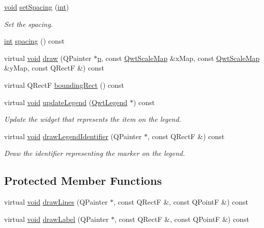 \begin{DoxyCompactItemize}
\item 
\hyperlink{group___u_a_v_objects_plugin_ga444cf2ff3f0ecbe028adce838d373f5c}{void} \hyperlink{class_qwt_plot_marker_a856c9c5c6e22d86461ee6df101534831}{set\-Spacing} (\hyperlink{ioapi_8h_a787fa3cf048117ba7123753c1e74fcd6}{int})
\begin{DoxyCompactList}\small\item\em Set the spacing. \end{DoxyCompactList}\item 
\hyperlink{ioapi_8h_a787fa3cf048117ba7123753c1e74fcd6}{int} \hyperlink{class_qwt_plot_marker_ad7655fdd7089b6c8058c238f1462f298}{spacing} () const 
\item 
virtual \hyperlink{group___u_a_v_objects_plugin_ga444cf2ff3f0ecbe028adce838d373f5c}{void} \hyperlink{class_qwt_plot_marker_abfd653364d9feeac09cd7ba77a650e3b}{draw} (Q\-Painter $\ast$\hyperlink{glext_8h_aa5367c14d90f462230c2611b81b41d23}{p}, const \hyperlink{class_qwt_scale_map}{Qwt\-Scale\-Map} \&x\-Map, const \hyperlink{class_qwt_scale_map}{Qwt\-Scale\-Map} \&y\-Map, const Q\-Rect\-F \&) const 
\item 
virtual Q\-Rect\-F \hyperlink{class_qwt_plot_marker_a270ada9e0a68dcfd5cf0f7629af898a2}{bounding\-Rect} () const 
\item 
virtual \hyperlink{group___u_a_v_objects_plugin_ga444cf2ff3f0ecbe028adce838d373f5c}{void} \hyperlink{class_qwt_plot_marker_a75ea063a742c23ab1952fc2bf96b5762}{update\-Legend} (\hyperlink{class_qwt_legend}{Qwt\-Legend} $\ast$) const 
\begin{DoxyCompactList}\small\item\em Update the widget that represents the item on the legend. \end{DoxyCompactList}\item 
virtual \hyperlink{group___u_a_v_objects_plugin_ga444cf2ff3f0ecbe028adce838d373f5c}{void} \hyperlink{class_qwt_plot_marker_ae99020d14c8ec4567ed94cdeb805fea1}{draw\-Legend\-Identifier} (Q\-Painter $\ast$, const Q\-Rect\-F \&) const 
\begin{DoxyCompactList}\small\item\em Draw the identifier representing the marker on the legend. \end{DoxyCompactList}\end{DoxyCompactItemize}
\subsection*{Protected Member Functions}
\begin{DoxyCompactItemize}
\item 
virtual \hyperlink{group___u_a_v_objects_plugin_ga444cf2ff3f0ecbe028adce838d373f5c}{void} \hyperlink{class_qwt_plot_marker_a4f0ebfc835da7397ee823860cfac62ca}{draw\-Lines} (Q\-Painter $\ast$, const Q\-Rect\-F \&, const Q\-Point\-F \&) const 
\item 
virtual \hyperlink{group___u_a_v_objects_plugin_ga444cf2ff3f0ecbe028adce838d373f5c}{void} \hyperlink{class_qwt_plot_marker_a528aa01fd96e43829afc817433da49d4}{draw\-Label} (Q\-Painter $\ast$, const Q\-Rect\-F \&, const Q\-Point\-F \&) const 
\end{DoxyCompactItemize}


